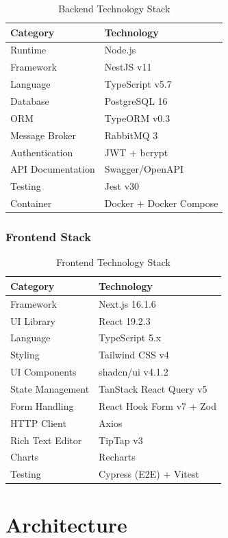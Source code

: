 \documentclass[12pt,a4paper]{article}
\begin{document}
\begin{table}[h]
\centering
\caption{Backend Technology Stack}
\begin{tabular}{@{}ll@{}}
\toprule
Category & Technology \\
\midrule
Runtime & Node.js \\
Framework & NestJS v11 \\
Language & TypeScript v5.7 \\
Database & PostgreSQL 16 \\
ORM & TypeORM v0.3 \\
Message Broker & RabbitMQ 3 \\
Authentication & JWT + bcrypt \\
API Documentation & Swagger/OpenAPI \\
Testing & Jest v30 \\
Container & Docker + Docker Compose \\
\bottomrule
\end{tabular}
\end{table}

\subsubsection{Frontend Stack}

\begin{table}[h]
\centering
\caption{Frontend Technology Stack}
\begin{tabular}{@{}ll@{}}
\toprule
Category & Technology \\
\midrule
Framework & Next.js 16.1.6 \\
UI Library & React 19.2.3 \\
Language & TypeScript 5.x \\
Styling & Tailwind CSS v4 \\
UI Components & shadcn/ui v4.1.2 \\
State Management & TanStack React Query v5 \\
Form Handling & React Hook Form v7 + Zod \\
HTTP Client & Axios \\
Rich Text Editor & TipTap v3 \\
Charts & Recharts \\
Testing & Cypress (E2E) + Vitest \\
\bottomrule
\end{tabular}
\end{table}

\newpage

\section{Architecture}
\label{sec:architecture}
\end{document}
